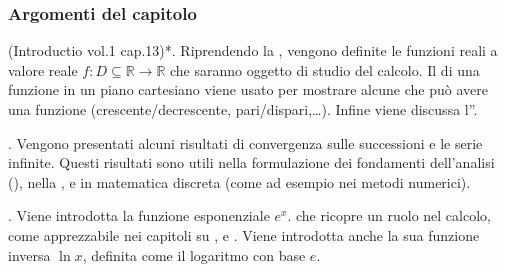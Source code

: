 \documentclass[letterpaper,10pt,italian]{jupyterBook}
\begin{document}
\subsubsection*{Argomenti del capitolo}

\sphinxAtStartPar
{\hyperref[\detokenize{ch/precalculus/real-functions:math-hs-precalculus-real-functions}]{}} (Introductio vol.1 cap.1\sphinxhyphen{}3)*. Riprendendo la {\hyperref[\detokenize{ch/set:math-hs-fun}]{}}, vengono definite le funzioni reali a valore reale \(f: D \subseteq \mathbb{R} \rightarrow \mathbb{R}\) che saranno oggetto di studio del calcolo. Il {\hyperref[\detokenize{ch/precalculus/real-functions:math-hs-precalculus-real-functions-plot}]{}} di una funzione in un piano cartesiano viene usato per mostrare alcune {\hyperref[\detokenize{ch/precalculus/real-functions:math-hs-precalculus-real-functions-types}]{}} che può avere una funzione (crescente/decrescente, pari/dispari,…). Infine viene discussa l”{\hyperref[\detokenize{ch/precalculus/real-functions:math-hs-precalculus-real-functions-inverse}]{}}.

\sphinxAtStartPar
{\hyperref[\detokenize{ch/series:math-hs-sequence-series-numerical-real}]{}} . Vengono presentati alcuni risultati di convergenza sulle successioni e le serie infinite. Questi risultati sono utili nella formulazione dei fondamenti dell’analisi (), nella {\hyperref[\detokenize{ch/precalculus/exponential_logarithm:math-hs-exp-def}]{}}, e in matematica discreta (come ad esempio nei metodi numerici).

\sphinxAtStartPar
{\hyperref[\detokenize{ch/precalculus/exponential_logarithm:math-hs-exp-log}]{}} . Viene introdotta la funzione esponenziale \(e^x\). che ricopre un ruolo  nel calcolo, come apprezzabile nei capitoli su {\hyperref[\detokenize{ch/infinitesimal_calculus/derivatives:infinitesimal-calculus-derivatives}]{}}, {\hyperref[\detokenize{ch/infinitesimal_calculus/integrals:infinitesimal-calculus-integrals}]{}} e {\hyperref[\detokenize{ch/ode:ode-hs}]{}}.
Viene introdotta anche la sua funzione inversa \(\ln x\), definita come il logaritmo con base \(e\).
\end{document}
